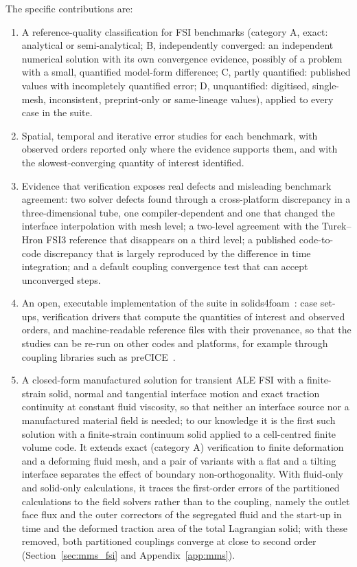 The specific contributions are:
\begin{enumerate}
    \item A reference-quality classification for FSI benchmarks (category A, exact: analytical or semi-analytical; B, independently converged: an independent numerical solution with its own convergence evidence, possibly of a problem with a small, quantified model-form difference; C, partly quantified: published values with incompletely quantified error; D, unquantified: digitised, single-mesh, inconsistent, preprint-only or same-lineage values), applied to every case in the suite.
    \item Spatial, temporal and iterative error studies for each benchmark, with observed orders reported only where the evidence supports them, and with the slowest-converging quantity of interest identified.
    \item Evidence that verification exposes real defects and misleading benchmark agreement: two solver defects found through a cross-platform discrepancy in a three-dimensional tube, one compiler-dependent and one that changed the interface interpolation with mesh level; a two-level agreement with the Turek--Hron FSI3 reference that disappears on a third level; a published code-to-code discrepancy that is largely reproduced by the difference in time integration; and a default coupling convergence test that can accept unconverged steps.
    \item An open, executable implementation of the suite in solids4foam~\citep{Cardiff2025}: case set-ups, verification drivers that compute the quantities of interest and observed orders, and machine-readable reference files with their provenance, so that the studies can be re-run on other codes and platforms, for example through coupling libraries such as preCICE~\citep{Chourdakis2022}.
    \item A closed-form manufactured solution for transient ALE FSI with a finite-strain solid, normal and tangential interface motion and exact traction continuity at constant fluid viscosity, so that neither an interface source nor a manufactured material field is needed; to our knowledge it is the first such solution with a finite-strain continuum solid applied to a cell-centred finite volume code. It extends exact (category A) verification to finite deformation and a deforming fluid mesh, and a pair of variants with a flat and a tilting interface separates the effect of boundary non-orthogonality. With fluid-only and solid-only calculations, it traces the first-order errors of the partitioned calculations to the field solvers rather than to the coupling, namely the outlet face flux and the outer correctors of the segregated fluid and the start-up in time and the deformed traction area of the total Lagrangian solid; with these removed, both partitioned couplings converge at close to second order (Section~\ref{sec:mms_fsi} and Appendix~\ref{app:mms}).
\end{enumerate}


